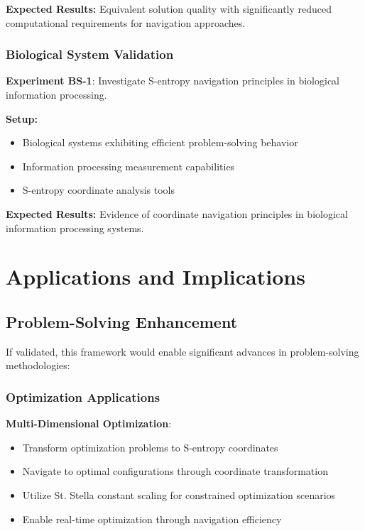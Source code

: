 \documentclass[11pt]{article}
\begin{document}
\textbf{Expected Results:} Equivalent solution quality with significantly reduced computational requirements for navigation approaches.

\subsubsection{Biological System Validation}

\textbf{Experiment BS-1}: Investigate S-entropy navigation principles in biological information processing.

\textbf{Setup:}
\begin{itemize}
\item Biological systems exhibiting efficient problem-solving behavior
\item Information processing measurement capabilities
\item S-entropy coordinate analysis tools
\end{itemize}

\textbf{Expected Results:} Evidence of coordinate navigation principles in biological information processing systems.

\section{Applications and Implications}

\subsection{Problem-Solving Enhancement}

If validated, this framework would enable significant advances in problem-solving methodologies:

\subsubsection{Optimization Applications}

\textbf{Multi-Dimensional Optimization}:
\begin{itemize}
\item Transform optimization problems to S-entropy coordinates
\item Navigate to optimal configurations through coordinate transformation
\item Utilize St. Stella constant scaling for constrained optimization scenarios
\item Enable real-time optimization through navigation efficiency
\end{itemize}
\end{document}
